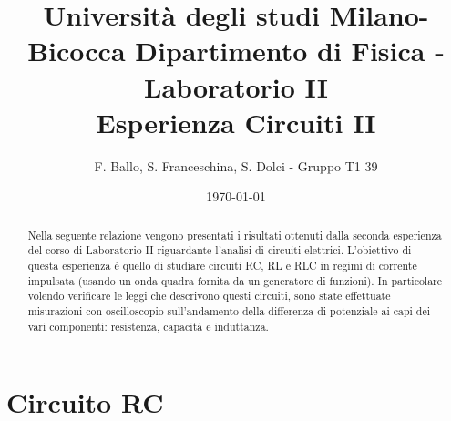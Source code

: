 \documentclass[letterpaper,12pt]{article}
\begin{document}
\title{{\small Università degli studi Milano-Bicocca  Dipartimento di Fisica - Laboratorio II }\\
    Esperienza Circuiti II}
\author{F. Ballo, S. Franceschina, S. Dolci - Gruppo T1 39}
\date{\today}
\maketitle
\thispagestyle{logoheader}


\begin{abstract}
Nella seguente relazione vengono presentati i risultati ottenuti dalla seconda esperienza del corso di Laboratorio II riguardante l'analisi di circuiti elettrici. L'obiettivo di questa esperienza è quello di studiare circuiti RC, RL e RLC in regimi di corrente impulsata (usando un onda quadra fornita da un generatore di funzioni). In particolare volendo verificare le leggi che descrivono questi circuiti, sono state effettuate misurazioni con oscilloscopio sull'andamento della differenza di potenziale ai capi dei vari componenti: resistenza, capacità e induttanza.

\begin{adjustwidth}{-1cm}{-1cm}


\end{adjustwidth}
\end{abstract}
\tableofcontents
\newpage

\section{Circuito RC}
\end{document}
